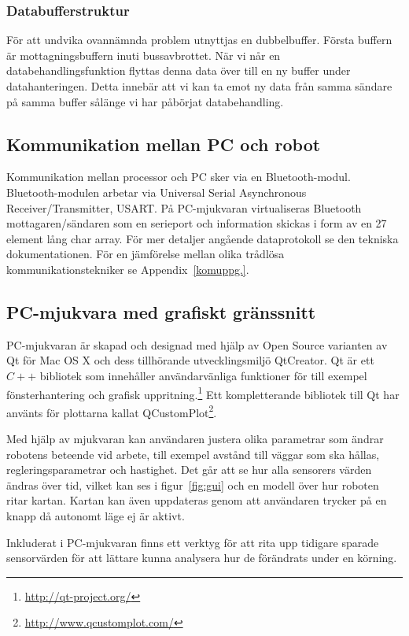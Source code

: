 \documentclass[a4paper,12pt,fleqn]{article}
\begin{document}
\subsubsection{Databufferstruktur}
För att undvika ovannämnda problem utnyttjas en dubbelbuffer. Första buffern är mottagningsbuffern inuti bussavbrottet. När vi når en databehandlingsfunktion flyttas denna data över till en ny buffer under datahanteringen. Detta innebär att vi kan ta emot ny data från samma sändare på samma buffer sålänge vi har påbörjat databehandling.

\subsection{Kommunikation mellan PC och robot}
Kommunikation mellan processor och PC sker via en Bluetooth-modul. Bluetooth-modulen arbetar via Universal Serial Asynchronous Receiver/Transmitter, USART.
På PC-mjukvaran virtualiseras Bluetooth mottagaren/sändaren som en serieport och information skickas i form av en 27 element lång char array. För mer detaljer angående dataprotokoll se den tekniska dokumentationen. För en jämförelse mellan olika trådlösa kommunikationstekniker se Appendix~\ref{komuppg.}.

\subsection{PC-mjukvara med grafiskt gränssnitt}

PC-mjukvaran är skapad och designad med hjälp av Open Source varianten av Qt för Mac OS X och dess tillhörande utvecklingsmiljö QtCreator. Qt är ett $C++$ bibliotek som innehåller användarvänliga funktioner för till exempel fönsterhantering och grafisk uppritning.\footnote{\url{http://qt-project.org/}} Ett kompletterande bibliotek till Qt har använts för plottarna kallat QCustomPlot\footnote{\url{http://www.qcustomplot.com/}}.

Med hjälp av mjukvaran kan användaren justera olika parametrar som ändrar robotens beteende vid arbete, till exempel avstånd till väggar som ska hållas, regleringsparametrar och hastighet. Det går att se hur alla sensorers värden ändras över tid, vilket kan ses i figur~\ref{fig:gui} och en modell över hur roboten ritar kartan. Kartan kan även uppdateras genom att användaren trycker på en knapp då autonomt läge ej är aktivt.

Inkluderat i PC-mjukvaran finns ett verktyg för att rita upp tidigare sparade sensorvärden för att lättare kunna analysera hur de förändrats under en körning.
\end{document}
